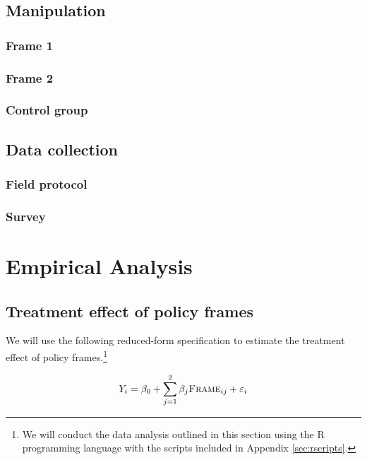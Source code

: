 \documentclass[11pt, a4paper]{article}\usepackage[]{graphicx}\usepackage[]{color}
\begin{document}
    \subsection{Manipulation}

        \subsubsection{Frame 1}
        \subsubsection{Frame 2}
        \subsubsection{Control group}

    \subsection{Data collection}

        \subsubsection{Field protocol}

        \subsubsection{Survey}

\section{Empirical Analysis}

    \subsection{Treatment effect of policy frames}

        We will use the following reduced-form specification to estimate the treatment effect of policy frames.\footnote{We will conduct the data analysis outlined in this section using the R programming language with the scripts included in Appendix \ref{sec:rscripts}.}

  		\begin{equation} \label{eq:teffect}
		Y_{i} = \beta_{0} + \sum_{j=1}^{2} \beta_{j}\text{\textsc{Frame}}_{ij} + \varepsilon_{i}
		\end{equation}
\end{document}

